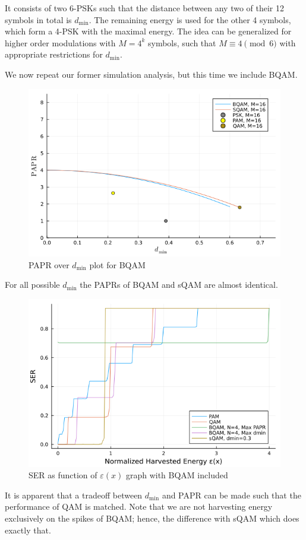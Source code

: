 \documentclass[11pt,a4paper,onecolumn,final]{article}
\newcommand{\dmin}{d_\text{min}}
\newcommand{\eps}{\varepsilon}
\begin{document}
It consists of two 6-PSKs such that the distance between any two of their 12 symbols in total is \(\dmin\). The remaining energy is used for the other 4 symbols, which form a 4-PSK with the maximal energy. The idea can be generalized for higher order modulations with \(M = 4^k\) symbols, such that \(M \equiv 4 \pmod 6\) with appropriate restrictions for \(\dmin\). 

We now repeat our former simulation analysis, but this time we include BQAM. 
\begin{figure}[h]
    \centering
    \includegraphics[scale=0.58]{bqam_papr_dmin.png}
    \caption{PAPR over \(\dmin\) plot for BQAM}
\end{figure}

For all possible \(\dmin\) the PAPRs of BQAM and sQAM are almost identical. 

\begin{figure}[h]
    \centering
    \includegraphics[scale=0.58]{bqam_ex2_a.png}
    \caption{SER as function of \(\eps(x)\) graph with BQAM included}
\end{figure}
It is apparent that a tradeoff between \(\dmin \) and PAPR can be made such that the performance of QAM is matched. Note that we are not harvesting energy exclusively on the spikes of BQAM; hence, the difference with sQAM which does exactly that. 
\end{document}
